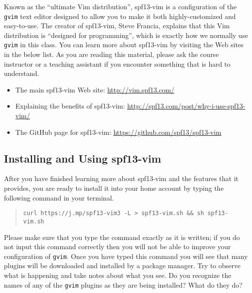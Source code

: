 Known as the ``ultimate Vim distribution'', spf13-vim is a configuration of the {\tt gvim} text editor designed to allow
you to make it both highly-customized and easy-to-use.  The creator of spf13-vim, Steve Francia, explains that this Vim
distribution is ``designed for programming'', which is exactly how we normally use {\tt gvim} in this class. You can
learn more about spf13-vim by visiting the Web sites in the below list.  As you are reading this material, please ask
the course instructor or a teaching assistant if you encounter something that is hard to understand.

\vspace*{-.1in}
\begin{itemize}
  \setlength{\itemsep}{.01in}
  \item The main spf13-vim Web site: \url{http://vim.spf13.com/}
  \item Explaining the benefits of spf13-vim: \url{http://spf13.com/post/why-i-use-spf13-vim/}
  \item The GitHub page for spf13-vim: \url{https://github.com/spf13/spf13-vim}
\end{itemize}

\vspace*{-.30in}
\subsection*{Installing and Using spf13-vim}
\vspace*{-.05in}

After you have finished learning more about spf13-vim and the features that it provides, you are ready to install it
into your home account by typing the following command in your terminal.

\vspace*{-.125in}
\begin{quote}
  {\tt curl https://j.mp/spf13-vim3 -L > spf13-vim.sh \&\& sh spf13-vim.sh}
\end{quote}
\vspace*{-.125in}

Please make sure that you type the command exactly as it is written; if you do not input this command correctly then you
will not be able to improve your configuration of {\tt gvim}. Once you have typed this command you will see that many
plugins will be downloaded and installed by a package manager.  Try to observe what is happening and take notes about
what you see. Do you recognize the names of any of the {\tt gvim} plugins as they are being installed? What do they do?

